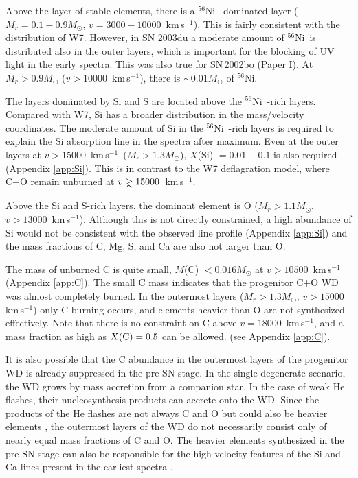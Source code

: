 \documentclass[usegraphicx,usenatbib]{mn2e}
\newcommand{\kms}{\mbox{\,km\,s$^{-1}$}}
\newcommand{\eg}{e.g.,\ }
\newcommand{\Msun}{M_{\odot}}
\newcommand{\Nifs}{$^{56}$Ni}
\def\gsim{\mathrel{\rlap{\lower 4pt \hbox{\hskip 1pt $\sim$}}\raise 1pt\hbox {$>$}}}
\begin{document}
Above the layer of stable elements, there is a \Nifs\ -dominated layer ($M_r =
0.1-0.9 \Msun$, $v=3000-10000$ \kms). This is fairly consistent with the
distribution of W7. However, in SN 2003du a moderate amount of \Nifs\ is
distributed also in the outer layers, which is important for the blocking of UV
light in the early spectra. This was also true for SN\,2002bo (Paper I). At $M_r
> 0.9 \Msun$ ($v>10000$ \kms), there is $\sim 0.01 \Msun$ of \Nifs. 

The layers dominated by Si and S are located above the \Nifs\ -rich layers.
Compared with W7, Si has a broader distribution in the mass/velocity
coordinates. The moderate amount of Si in the \Nifs\ -rich layers is required to
explain the Si absorption line in the spectra after maximum. Even at the outer
layers at $v>15000$ \kms\ ($M_r > 1.3 \Msun$), $X$(Si) $=0.01-0.1$ is also
required (Appendix \ref{app:Si}). This is in contrast to the W7 deflagration
model, where C+O remain unburned at $v\gsim 15000$ \kms.

Above the Si and S-rich layers, the dominant element is O ($M_r > 1.1 \Msun$,
$v>13000$ \kms). Although this is not directly constrained, a high abundance of
Si would not be consistent with the observed line profile (Appendix
\ref{app:Si}) and the mass fractions of C, Mg, S, and Ca are also not larger
than O.

The mass of unburned C is quite small, $M$(C) $< 0.016 \Msun$ at $v > 10500$
\kms (Appendix \ref{app:C}). The small C mass indicates that the progenitor C+O
WD was almost completely burned. In the outermost layers ($M_r > 1.3 \Msun$,
$v>15000$ \kms) only C-burning occurs, and elements heavier than O are not
synthesized effectively.
Note that there is no constraint on C above $v=18000$ \kms, 
and a mass fraction as high as $X({\rm C})=0.5$ can be allowed.
(see Appendix \ref{app:C}).

It is also possible that the C abundance in the outermost
layers of the progenitor WD is already suppressed in the pre-SN stage. In the
single-degenerate scenario, the WD grows by mass accretion from a companion
star. In the case of weak He flashes, their nucleosynthesis products can accrete
onto the WD. Since the products of the He flashes are not always C and O but
could also be heavier elements \citep[\eg][]{hashimoto83}, the outermost layers
of the WD do not necessarily consist  only of nearly equal mass fractions of C
and O.
The heavier elements synthesized in the pre-SN stage 
can also be responsible for the high velocity features of the Si and Ca lines
present in the earliest spectra \citep{tanaka08Ia}.
\end{document}
